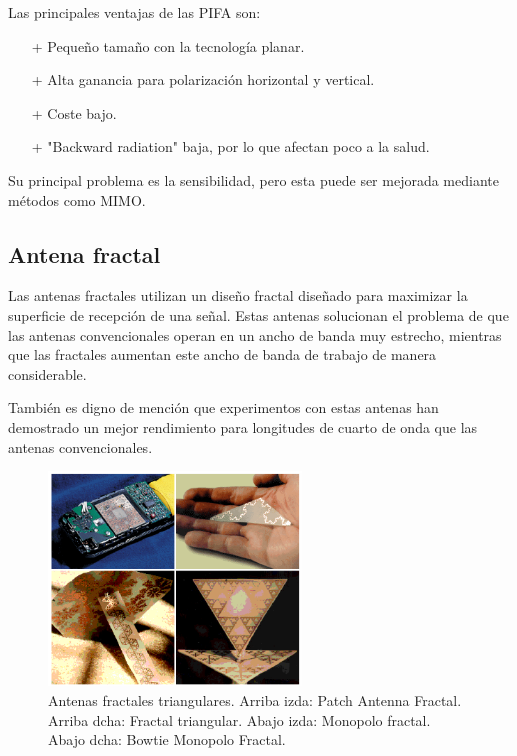 \documentclass[a4paper,11pt,titlepage]{article}
\begin{document}
Las principales ventajas de las PIFA son:
\begin{itemize}
\item[+] Pequeño tamaño con la tecnología planar.
\item[+] Alta ganancia para polarización horizontal y vertical.
\item[+] Coste bajo.
\item[+] "Backward radiation" baja, por lo que afectan poco a la salud.
\end{itemize}
Su principal problema es la sensibilidad, pero esta puede ser mejorada mediante métodos como MIMO.
\subsection{Antena fractal}
Las antenas fractales utilizan un diseño fractal diseñado para maximizar la superficie de recepción de una señal. Estas antenas solucionan el problema de que las antenas convencionales operan en un ancho de banda muy estrecho, mientras que las fractales aumentan este ancho de banda de trabajo de manera considerable.\par
También es digno de mención que experimentos con estas antenas han demostrado un mejor rendimiento para longitudes de cuarto de onda que las antenas convencionales.
\begin{figure}[H]
\centering
\includegraphics[width=0.6\textwidth]{fractal}
\caption{Antenas fractales triangulares. Arriba izda: Patch Antenna Fractal. Arriba dcha: Fractal triangular. Abajo izda: Monopolo fractal. Abajo dcha: Bowtie Monopolo Fractal. }
\end{figure}
\end{document}
